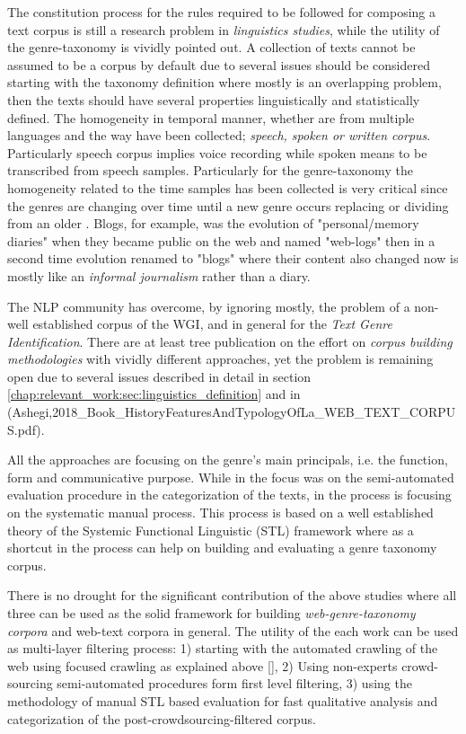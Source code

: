 The constitution process for the rules required to be followed for composing a text corpus is still a research problem in \textit{linguistics studies}, while the utility of the genre-taxonomy is vividly pointed out. A collection of texts cannot be assumed to be a corpus by default due to several issues should be considered starting with the taxonomy definition where mostly is an overlapping problem, then the texts should have several properties linguistically and statistically defined. The homogeneity in temporal manner, whether are from multiple languages and the way have been collected; \textit{speech, spoken or written corpus}. Particularly speech corpus implies voice recording while spoken means to be transcribed from speech samples. Particularly for the genre-taxonomy the homogeneity related to the time samples has been collected is very critical since the genres are changing over time until a new genre occurs replacing or dividing from an older \parencite{dash2018history}. Blogs, for example, was the evolution of "personal/memory diaries" when they became public on the web and named "web-logs" then in a second time evolution renamed to "blogs" where their content also changed now is mostly like an \textit{informal journalism} rather than a diary.

The NLP community has overcome, by ignoring mostly, the problem of a non-well established corpus of the WGI, and in general for the \textit{Text Genre Identification}. There are at least tree publication on the effort on \textit{corpus building methodologies} with vividly different approaches, yet the problem is remaining open due to several issues described in detail in section
\ref{chap:relevant_work:sec:linguistics_definition} and in \parencite{melissourgou2017genre,asheghi2014semi} (Ashegi,2018_Book_HistoryFeaturesAndTypologyOfLa_WEB_TEXT_CORPUS.pdf). 

All the approaches are focusing on the genre's main principals, i.e. the function, form and communicative purpose. While in \cite{asheghi2014semi} the focus was on the semi-automated evaluation procedure in the categorization of the texts, in \parencite{melissourgou2017genre} the process is focusing on the systematic manual process.  This process is based on a well established theory of  the Systemic Functional Linguistic (STL) framework where as a shortcut in the process can help on building and evaluating a genre taxonomy corpus. 

There is no drought for the significant contribution of the above studies where all three can be used as the solid framework for building \textit{web-genre-taxonomy corpora} and web-text corpora in general. The utility of the each work can be used as multi-layer filtering process:  1) starting with the automated crawling of the web using focused crawling as explained above \ref{}, 2) Using non-experts crowd-sourcing semi-automated procedures form first level filtering, 3) using the methodology of manual STL based evaluation for fast qualitative analysis and categorization of the post-crowdsourcing-filtered corpus. 

